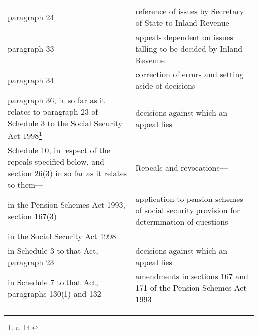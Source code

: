 \documentclass[12pt,a4paper]{article}
\begin{document}
{\begin{longtable}{p{194.88643pt}p{171.11186pt}}
    paragraph 24 
&
	\hspace*{1em}reference of issues by Secretary of \hspace*{1em}State to Inland Revenue\\
\hspace{1em}%
    paragraph 33 
&
	\hspace*{1em}appeals dependent on issues falling \hspace*{1em}to be decided by Inland Revenue\\
\hspace{1em}%
    paragraph 34 
&
	\hspace*{1em}correction of errors and setting aside \hspace*{1em}of decisions\\
\hspace{1em}%
    paragraph 36, in so far as it relates to \hspace*{1em}paragraph 23 of Schedule 3 to the Social \hspace*{1em}Security Act 1998\footnote{\frenchspacing 1998 c. 14.} 
&
	\hspace*{1em}decisions against which an appeal \hspace*{1em}lies\\
Schedule 10, in respect of the repeals specified below, and section 26(3) in so far as it relates to them—	&Repeals and revocations—\\
\hspace{1em}%
    in the Pension Schemes Act 1993, section \hspace*{1em}167(3) 
&
	\hspace*{1em}application to pension schemes of so\-\hspace*{1em}cial security provision for determina\-\hspace*{1em}tion of questions\\
\hspace{1em}%
    in the Social Security Act 1998— \\
\hspace{2em}%
    in Schedule 3 to that Act, paragraph 23 
&
	\hspace*{1em}decisions against which an appeal \hspace*{1em}lies\\
\hspace{2em}%
    in Schedule 7 to that Act, paragraphs \hspace*{2em}130(1) and 132 
&
	\hspace*{1em}amendments in sections 167 and 171 \hspace*{1em}of the Pension Schemes Act 1993\\
\end{longtable}

}
\end{document}
